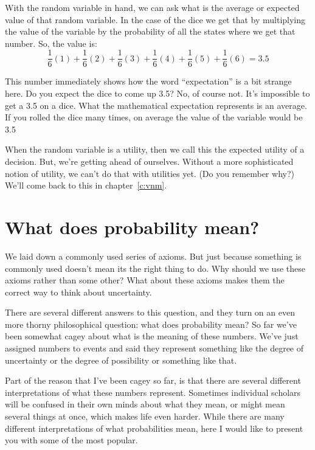 With the random variable in hand, we can ask what is the average or expected value of that random variable.  In the case of the dice we get that by multiplying the value of the variable by the probability of all the states where we get that number.  So, the value is:
\begin{equation*}
    \frac{1}{6} (1) + \frac{1}{6} (2) + \frac{1}{6} (3) + \frac{1}{6} (4) + \frac{1}{6} (5) + \frac{1}{6} (6) = 3.5
\end{equation*}

This number immediately shows how the word ``expectation'' is a bit strange here.  Do you expect the dice to come up 3.5?  No, of course not. It's impossible to get a 3.5 on a dice. What the mathematical expectation represents is an average. If you rolled the dice many times, on average the value of the variable would be 3.5

When the random variable is a utility, then we call this the expected utility of a decision.  But, we're getting ahead of ourselves.  Without a more sophisticated notion of utility, we can't do that with utilities yet. (Do you remember why?)  We'll come back to this in chapter~\ref{c:vnm}.

\section{What does probability mean?}
\label{s:prob-interpretation}

We laid down a commonly used series of axioms.  But just because something is commonly used doesn't mean its the right thing to do.  Why should we use these axioms rather than some other?  What about these axioms makes them the correct way to think about uncertainty.

There are several different answers to this question, and they turn on an even more thorny philosophical question: what does probability mean? So far we've been somewhat cagey about what is the meaning of these numbers.  We've just assigned numbers to events and said they represent something like the degree of uncertainty or the degree of possibility or something like that.

Part of the reason that I've been cagey so far, is that there are several different interpretations of what these numbers represent. Sometimes individual scholars will be confused in their own minds about what they mean, or might mean several things at once, which makes life even harder.  While there are many different interpretations of what probabilities mean, here I would like to present you with some of the most popular.

